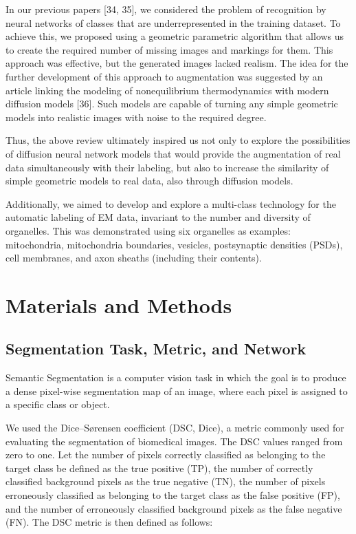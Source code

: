 \documentclass[journal,article,submit,pdftex,moreauthors]{Definitions/mdpi}
\begin{document}
In our previous papers [34, 35], we considered the problem of recognition by neural networks of classes that are underrepresented in the training dataset. To achieve this, we proposed using a geometric parametric algorithm that allows us to create the required number of missing images and markings for them. This approach was effective, but the generated images lacked realism. The idea for the further development of this approach to augmentation was suggested by an article linking the modeling of nonequilibrium thermodynamics with modern diffusion models [36]. Such models are capable of turning any simple geometric models into realistic images with noise to the required degree.

Thus, the above review ultimately inspired us not only to explore the possibilities of diffusion neural network models that would provide the augmentation of real data simultaneously with their labeling, but also to increase the similarity of simple geometric models to real data, also through diffusion models.

Additionally, we aimed to develop and explore a multi-class technology for the automatic labeling of EM data, invariant to the number and diversity of organelles. This was demonstrated using six organelles as examples: mitochondria, mitochondria boundaries, vesicles, postsynaptic densities (PSDs), cell membranes, and axon sheaths (including their contents).

\section{Materials and Methods}
\subsection{Segmentation Task, Metric, and Network}

Semantic Segmentation is a computer vision task in which the goal is to produce a dense pixel-wise segmentation map of an image, where each pixel is assigned to a specific class or object.

We used the Dice–Sørensen coefficient (DSC, Dice), a metric commonly used for evaluating the segmentation of biomedical images. The DSC values ranged from zero to one. Let the number of pixels correctly classified as belonging to the target class be defined as the true positive (TP), the number of correctly classified background pixels as the true negative (TN), the number of pixels erroneously classified as belonging to the target class as the false positive (FP), and the number of erroneously classified background pixels as the false negative (FN). The DSC metric is then defined as follows:
\end{document}
